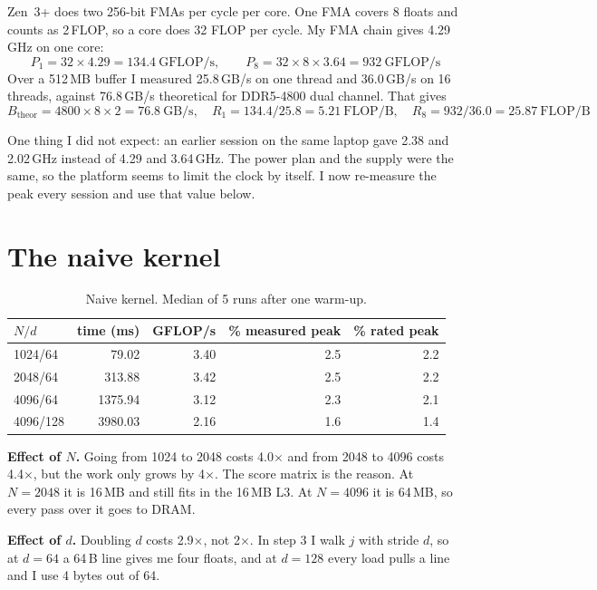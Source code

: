 \documentclass[10pt,a4paper]{article}
\begin{document}
Zen~3+ does two 256-bit FMAs per cycle per core. One FMA covers 8 floats and
counts as 2\,FLOP, so a core does 32 FLOP per cycle. My FMA chain gives
4.29\,GHz on one core:
\begin{equation*}
P_1 = 32\times4.29 = 134.4\ \text{GFLOP/s},\qquad
P_8 = 32\times8\times3.64 = 932\ \text{GFLOP/s}
\end{equation*}
Over a 512\,MB buffer I measured 25.8\,GB/s on one thread and
36.0\,GB/s on 16 threads, against 76.8\,GB/s theoretical for
DDR5-4800 dual channel. That gives
\begin{equation*}
B_\text{theor} = 4800\times8\times2 = 76.8\ \text{GB/s},\quad
R_1 = 134.4/25.8 = 5.21\ \text{FLOP/B},\quad
R_8 = 932/36.0 = 25.87\ \text{FLOP/B}
\end{equation*}

One thing I did not expect: an earlier session on the same laptop gave 2.38 and
2.02\,GHz instead of 4.29 and 3.64\,GHz. The power plan and the supply were the
same, so the platform seems to limit the clock by itself. I now re-measure the
peak every session and use that value below.

\section{The naive kernel}

\begin{table}[h]
\centering\footnotesize
\caption{Naive kernel. Median of 5 runs after one warm-up.}
\label{tab:naive}
\begin{tabular}{@{}lrrrr@{}}
\toprule
$N/d$ & time (ms) & GFLOP/s & \% measured peak & \% rated peak \\
\midrule
1024/64 &   79.02 &  3.40 &  2.5 &  2.2 \\
2048/64 &  313.88 &  3.42 &  2.5 &  2.2 \\
4096/64 & 1375.94 &  3.12 &  2.3 &  2.1 \\
4096/128 & 3980.03 &  2.16 &  1.6 &  1.4 \\
\bottomrule
\end{tabular}
\end{table}

\textbf{Effect of $N$.} Going from 1024 to 2048 costs
4.0$\times$ and from 2048 to 4096 costs
4.4$\times$, but the work only grows by
4$\times$. The score matrix is the reason. At $N{=}2048$ it is 16\,MB and still
fits in the 16\,MB L3. At $N{=}4096$ it is 64\,MB, so every pass over it goes to
DRAM.

\textbf{Effect of $d$.} Doubling $d$ costs
2.9$\times$, not 2$\times$. In step 3 I walk
$j$ with stride $d$, so at $d{=}64$ a 64\,B line gives me four floats, and at
$d{=}128$ every load pulls a line and I use 4 bytes out of 64.
\end{document}
